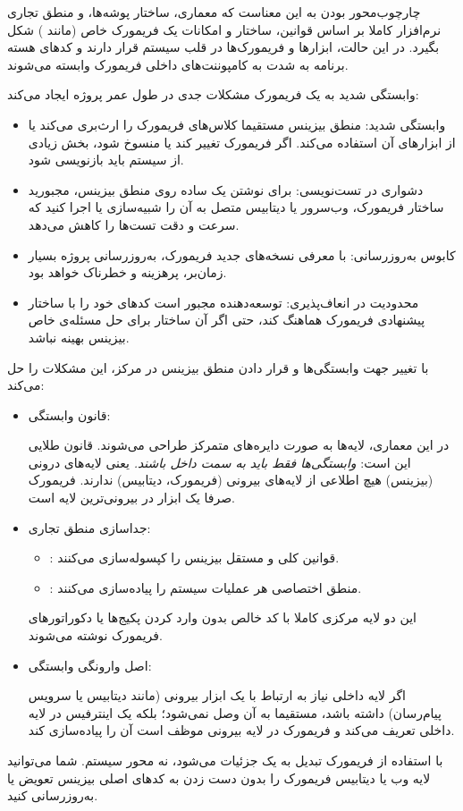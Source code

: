 {چارچوب‌محور بودن} به این معناست که معماری، ساختار پوشه‌ها، و منطق تجاری نرم‌افزار کاملا بر اساس قوانین، ساختار و امکانات یک فریمورک خاص (مانند ) شکل بگیرد. در این حالت، ابزارها و فریمورک‌ها در قلب سیستم قرار دارند و کدهای هسته برنامه به شدت به کامپوننت‌های داخلی فریمورک وابسته می‌شوند.

وابستگی شدید به یک فریمورک مشکلات جدی در طول عمر پروژه ایجاد می‌کند:
\begin{itemize}
    \item {وابستگی شدید:} منطق بیزینس مستقیما کلاس‌های فریمورک را ارث‌بری می‌کند یا از ابزارهای آن استفاده می‌کند. اگر فریمورک تغییر کند یا منسوخ شود، بخش زیادی از سیستم باید بازنویسی شود.
    \item {دشواری در تست‌نویسی:} برای نوشتن یک  ساده روی منطق بیزینس، مجبورید ساختار فریمورک، وب‌سرور یا دیتابیس متصل به آن را شبیه‌سازی یا اجرا کنید که سرعت و دقت تست‌ها را کاهش می‌دهد.
    \item {کابوس به‌روزرسانی:} با معرفی نسخه‌های جدید فریمورک، به‌روزرسانی پروژه بسیار زمان‌بر، پرهزینه و خطرناک خواهد بود.
    \item {محدودیت در انعاف‌پذیری:} توسعه‌دهنده مجبور است کدهای خود را با ساختار پیشنهادی فریمورک هماهنگ کند، حتی اگر آن ساختار برای حل مسئله‌ی خاص بیزینس بهینه نباشد.
\end{itemize}

 با تغییر جهت وابستگی‌ها و قرار دادن {منطق بیزینس در مرکز}، این مشکلات را حل می‌کند:

\begin{itemize}

\item{ قانون وابستگی}:

در این معماری، لایه‌ها به صورت دایره‌های متمرکز طراحی می‌شوند. قانون طلایی این است: \textit{وابستگی‌ها فقط باید به سمت داخل باشند.} یعنی لایه‌های درونی (بیزینس) هیچ اطلاعی از لایه‌های بیرونی (فریمورک، دیتابیس) ندارند. فریمورک صرفا یک ابزار در بیرونی‌ترین لایه است.

\item{ جداسازی منطق تجاری}:
\begin{itemize}
    \item {}: قوانین کلی و مستقل بیزینس را کپسوله‌سازی می‌کنند.
    \item {}: منطق اختصاصی هر عملیات سیستم را پیاده‌سازی می‌کنند.
\end{itemize}
این دو لایه مرکزی کاملا با کد خالص بدون وارد کردن پکیج‌ها یا دکوراتورهای فریمورک نوشته می‌شوند.

\item{ اصل وارونگی وابستگی}:

اگر لایه داخلی نیاز به ارتباط با یک ابزار بیرونی (مانند دیتابیس یا سرویس پیام‌رسان) داشته باشد، مستقیما به آن وصل نمی‌شود؛ بلکه یک {اینترفیس} در لایه داخلی تعریف می‌کند و فریمورک در لایه بیرونی موظف است آن را پیاده‌سازی کند.

\end{itemize}

با استفاده از  {فریمورک تبدیل به یک جزئیات می‌شود}، نه محور سیستم. شما می‌توانید لایه وب یا دیتابیس فریمورک را بدون دست زدن به کدهای اصلی بیزینس تعویض یا به‌روزرسانی کنید.

